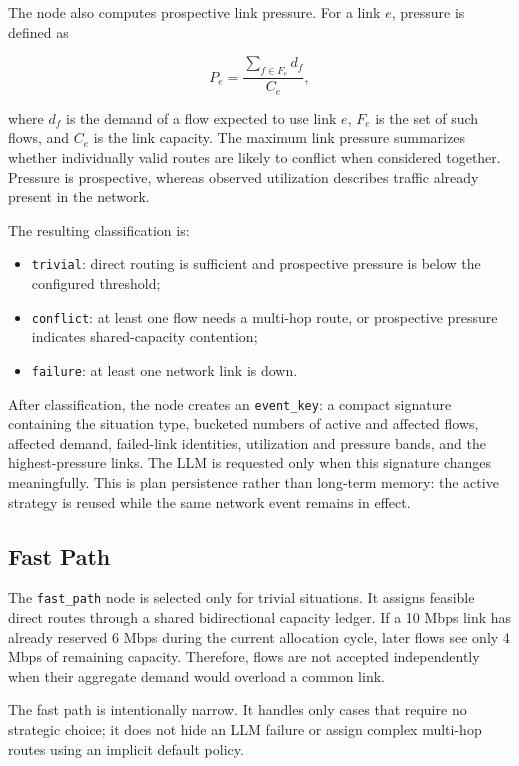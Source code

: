 The node also computes prospective link pressure. For a link $e$, pressure is defined
as

\begin{equation}
    P_e = \frac{\sum_{f \in F_e} d_f}{C_e},
\end{equation}

where $d_f$ is the demand of a flow expected to use link $e$, $F_e$ is the set of such
flows, and $C_e$ is the link capacity. The maximum link pressure summarizes whether
individually valid routes are likely to conflict when considered together. Pressure is
prospective, whereas observed utilization describes traffic already present in the
network.

The resulting classification is:

\begin{itemize}
    \item \texttt{trivial}: direct routing is sufficient and prospective pressure is
    below the configured threshold;
    \item \texttt{conflict}: at least one flow needs a multi-hop route, or prospective
    pressure indicates shared-capacity contention;
    \item \texttt{failure}: at least one network link is down.
\end{itemize}

After classification, the node creates an \texttt{event\_key}: a compact signature
containing the situation type, bucketed numbers of active and affected flows, affected
demand, failed-link identities, utilization and pressure bands, and the highest-pressure
links. The LLM is requested only when this signature changes meaningfully. This is plan
persistence rather than long-term memory: the active strategy is reused while the same
network event remains in effect.

\subsection{Fast Path}

The \texttt{fast\_path} node is selected only for trivial situations. It assigns
feasible direct routes through a shared bidirectional capacity ledger. If a 10 Mbps link
has already reserved 6 Mbps during the current allocation cycle, later flows see only
4 Mbps of remaining capacity. Therefore, flows are not accepted independently when
their aggregate demand would overload a common link.

The fast path is intentionally narrow. It handles only cases that require no strategic
choice; it does not hide an LLM failure or assign complex multi-hop routes using an
implicit default policy.

